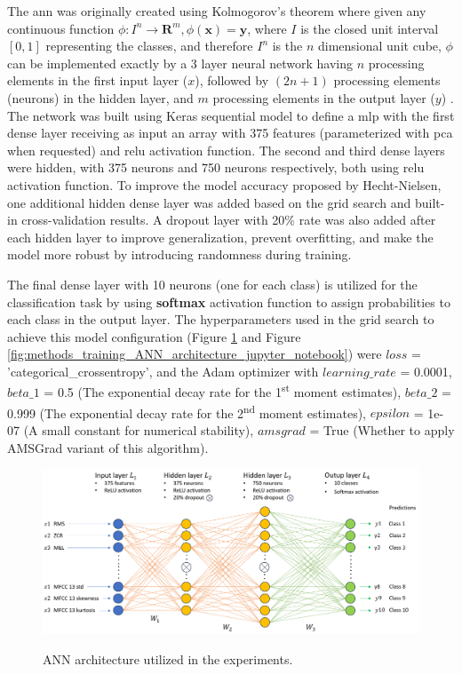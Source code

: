 The \gls{ann} was originally created using Kolmogorov's theorem where given any continuous function
$\phi: I^n \longrightarrow \mathbf{R}^m, \phi(\mathbf{x})=\mathbf{y}$, where $I$ is the closed unit interval $[0,1]$ representing the classes, and therefore $I^n$ is the $n$ dimensional unit cube, $\phi$ can be implemented exactly by a 3 layer neural network having $n$ processing elements in the first input layer ($x$), followed by $(2 n+1)$ processing elements (neurons) in the hidden layer, and $m$ processing elements in the output layer ($y$) \cite{Hecht-Nielsen1987}. The network was built using Keras sequential model to define a \gls{mlp} with the first dense layer receiving as input an array with 375 features (parameterized with \gls{pca} when requested) and \gls{relu} activation function. The second and third dense layers were hidden, with 375 neurons and 750 neurons respectively, both using \gls{relu} activation function. To improve the model accuracy proposed by Hecht-Nielsen, one additional hidden dense layer was added based on the grid search and built-in cross-validation results. A dropout layer with 20\% rate was also added after each hidden layer to improve generalization, prevent overfitting, and make the model more robust by introducing randomness during training.

The final dense layer with 10 neurons (one for each class) is utilized for the classification task by using \textbf{softmax} activation function to assign probabilities to each class in the output layer. The hyperparameters used in the grid search to achieve this model configuration (Figure \ref{fig:methods_training_ANN_architecture} and Figure \ref{fig:methods_training_ANN_architecture_jupyter_notebook}) were $loss$ = 'categorical\_crossentropy', and the Adam optimizer with $learning\_rate$ = 0.0001, $beta\_1$ = 0.5 (The exponential decay rate for the 1\textsuperscript{st} moment estimates), $beta\_2$ = 0.999 (The exponential decay rate for the 2\textsuperscript{nd} moment estimates), $epsilon$ = 1e-07 (A small constant for numerical stability), $amsgrad$ = True (Whether to apply AMSGrad variant \cite{Reddi2018} of this algorithm). 


\begin{figure}[htbp]
    \raggedright
        \caption{ANN architecture utilized in the experiments.}
        \includegraphics[width=1\textwidth]{resources/images/050-methods/Methods_training_ANN_architecture.png}
        \label{fig:methods_training_ANN_architecture}
\end{figure} 


